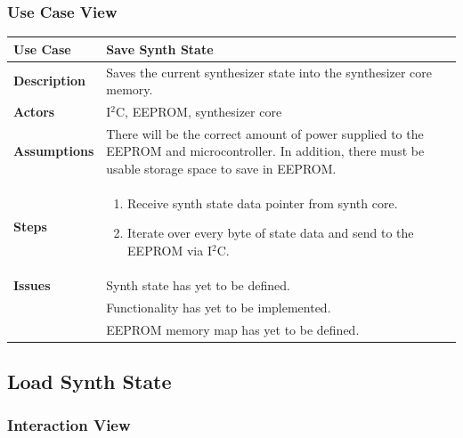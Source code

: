 \documentclass{article}
\begin{document}
\subsubsection{Use Case View}
\begin{tabular}{|p{1in}|p{5in}|}
\hline
\textbf{Use Case} & Save Synth State\\
\hline
\textbf{Description} & Saves the current synthesizer state into the synthesizer core memory.\\
\hline
\textbf{Actors} & I$^2$C, EEPROM, synthesizer core\\
\hline
\textbf{Assumptions} & There will be the correct amount of power supplied to the EEPROM and microcontroller.  In addition, there must be usable storage space to save in EEPROM.\\
\hline
\textbf{Steps} & \begin{enumerate}
\item Receive synth state data pointer from synth core.
\item Iterate over every byte of state data and send to the EEPROM via I$^2$C.
\end{enumerate}\\
\hline
\textbf{Issues} & Synth state has yet to be defined.\\
& Functionality has yet to be implemented.\\
& EEPROM memory map has yet to be defined.\\
\hline
\end{tabular}

\subsection{Load Synth State}
\subsubsection{Interaction View}
\end{document}
